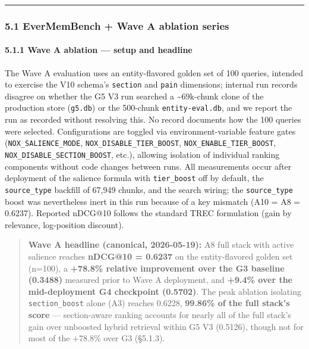 \documentclass[
]{article}
\begin{document}
\begin{center}\rule{0.5\linewidth}{0.5pt}\end{center}

\subsubsection{5.1 EverMemBench + Wave A ablation
series}\label{evermembench-wave-a-ablation-series}

\paragraph{5.1.1 Wave A ablation --- setup and
headline}\label{wave-a-ablation-setup-and-headline}

The Wave A evaluation uses an entity-flavored golden set of 100 queries,
intended to exercise the V10 schema's \texttt{section} and \texttt{pain}
dimensions; internal run records disagree on whether the G5 V3 run
searched a \textasciitilde69k-chunk clone of the production store
(\texttt{g5.db}) or the 500-chunk \texttt{entity-eval.db}, and we report
the run as recorded without resolving this. No record documents how the
100 queries were selected. Configurations are toggled via
environment-variable feature gates (\texttt{NOX\_SALIENCE\_MODE},
\texttt{NOX\_DISABLE\_TIER\_BOOST}, \texttt{NOX\_ENABLE\_TIER\_BOOST},
\texttt{NOX\_DISABLE\_SECTION\_BOOST}, etc.), allowing isolation of
individual ranking components without code changes between runs. All
measurements occur after deployment of the salience formula with
\texttt{tier\_boost} off by default, the \texttt{source\_type} backfill
of 67,949 chunks, and the search wiring; the \texttt{source\_type} boost
was nevertheless inert in this run because of a key mismatch (A10 = A8 =
0.6237). Reported nDCG@10 follows the standard TREC formulation (gain by
relevance, log-position discount).

\begin{quote}
\textbf{Wave A headline (canonical, 2026-05-19):} A8 full stack with
active salience reaches \textbf{nDCG@10 = 0.6237} on the entity-flavored
golden set (n=100), a \textbf{+78.8\% relative improvement over the G3
baseline (0.3488)} measured prior to Wave A deployment, and
\textbf{+9.4\% over the mid-deployment G4 checkpoint (0.5702)}. The peak
ablation isolating \texttt{section\_boost} alone (A3) reaches 0.6228,
\textbf{99.86\% of the full stack's score} --- section-aware ranking
accounts for nearly all of the full stack's gain over unboosted hybrid
retrieval within G5 V3 (0.5126), though not for most of the +78.8\% over
G3 (§5.1.3).
\end{quote}
\end{document}
